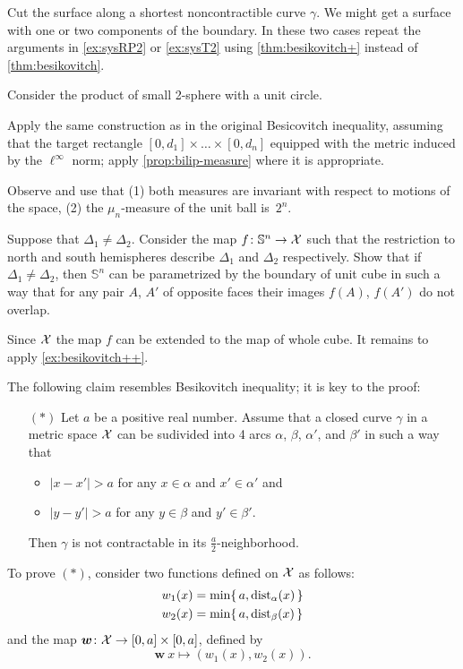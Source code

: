  Cut the surface along a shortest noncontractible curve $\gamma$. 
We might get a surface with one or two components of the boundary.
In these two cases repeat the arguments in \ref{ex:sysRP2} or \ref{ex:sysT2} using \ref{thm:besikovitch+} instead of \ref{thm:besikovitch}.


 Consider the product of small 2-sphere with a unit circle.

Apply the same construction as in the original Besicovitch inequality, assuming that the target rectangle
$[0,d_1]\times\dots\times [0,d_n]$ equipped with the metric induced by the $\ell^\infty$ norm;
apply \ref{prop:bilip-measure} where it is appropriate.

 Observe and use that 
(1) both measures are invariant with respect to motions of the space,
(2) the $\mu_n$-measure of the unit ball is~$2^n$. 

 Suppose that $\Delta_1\ne\Delta_2$.
Consider the map $f\colon\mathbb{S}^n\to \mathcal{X}$ such that the restriction to north and south hemispheres describe $\Delta_1$ and $\Delta_2$ respectively.
Show that if $\Delta_1\ne\Delta_2$, then $\mathbb{S}^n$ can be parametrized by the boundary of unit cube in such a way that for any pair $A$, $A'$ of opposite faces their images $f(A)$, $f(A')$ do not overlap.

Since $\mathcal{X}$ the map $f$ can be extended to the map of whole cube.
It remains to apply \ref{ex:besikovitch++}.


The following claim resembles Besikovitch inequality;
it is key to the proof:
\begin{itemize}
 \item[$({*})$] Let $a$ be a positive real number.
 Assume that a closed curve $\gamma$ in a metric space $\mathcal{X}$ can be sudivided into 4 arcs $\alpha$, $\beta$, $\alpha'$, and $\beta'$ in such a way that 
 \begin{itemize}
 \item $|x-x'|>a$ for any $x\in\alpha$ and $x'\in \alpha'$
 and
 \item $|y-y'|>a$ for any $y\in\beta$ and $y'\in \beta'$.
 \end{itemize}
 Then $\gamma$ is not contractable in its $\tfrac a2$-neighborhood.
\end{itemize}

To prove $({*})$, consider two functions defined on $\mathcal{X}$ as follows:
\begin{align*}
w_1(x)&=\min \{\,a,\mathrm{dist}_{\alpha}(x)\,\}
\\
w_2(x)&=\min \{\,a,\mathrm{dist}_{\beta}(x)\,\}
\end{align*}
and the map $\bm{w}\colon\mathcal{X}\to [0,a]\times[0,a]$, defined by
\[\bm{w}\:x\mapsto(w_1(x),w_2(x)).\]


